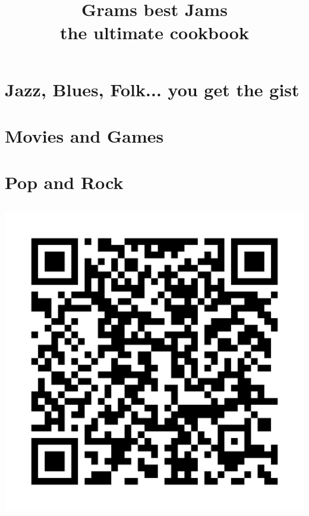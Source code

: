 \documentclass[openany]{book}
\title{Grams best Jams\\the ultimate cookbook}
\author{}
\date{}
\begin{document}
\maketitle
\frontmatter
\tableofcontents

\part{Jazz, Blues, Folk... you get the gist}







\part{Movies and Games}



\part{Pop and Rock}







\chapter[]{}
\includegraphics[width=1\linewidth]{QR_Codes/QR_SpotifyPlaylist.png}

\
\end{document}
